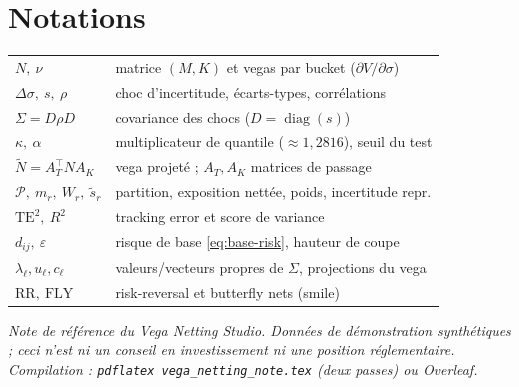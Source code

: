 \documentclass[11pt,a4paper]{article}
\newcommand{\code}[1]{\texttt{#1}}
\newcommand{\dsig}{\Delta\sigma}
\newcommand{\Nt}{\tilde{N}}
\newcommand{\st}{\tilde{s}}
\theoremstyle{plain}
\theoremstyle{definition}
\theoremstyle{remark}
\begin{document}
\section{Notations}
\begin{center}\small
\begin{tabular}{@{}ll@{}}
\toprule
$N,\ \nu$ & matrice $(M,K)$ et vegas par bucket ($\partial V/\partial\sigma$) \\
$\dsig,\ s,\ \rho$ & choc d'incertitude, écarts-types, corrélations \\
$\Sigma = D\rho D$ & covariance des chocs ($D=\operatorname{diag}(s)$) \\
$\kappa,\ \alpha$ & multiplicateur de quantile ($\approx1{,}2816$), seuil du test \\
$\Nt = A_T^\top N A_K$ & vega projeté ; $A_T,A_K$ matrices de passage \\
$\mathcal P,\ m_r,\ W_r,\ \st_r$ & partition, exposition nettée, poids, incertitude repr. \\
$\mathrm{TE}^2,\ R^2$ & tracking error et score de variance \\
$d_{ij},\ \varepsilon$ & risque de base \eqref{eq:base-risk}, hauteur de coupe \\
$\lambda_\ell, u_\ell, c_\ell$ & valeurs/vecteurs propres de $\Sigma$, projections du vega \\
$\mathrm{RR},\ \mathrm{FLY}$ & risk-reversal et butterfly nets (smile) \\
\bottomrule
\end{tabular}
\end{center}

\bigskip\noindent\hrulefill\par
\footnotesize
\noindent\emph{Note de référence du \emph{Vega Netting Studio}. Données de
démonstration synthétiques ; ceci n'est ni un conseil en investissement ni une position
réglementaire. Compilation : \code{pdflatex vega\_netting\_note.tex} (deux passes) ou
Overleaf.}
\end{document}
